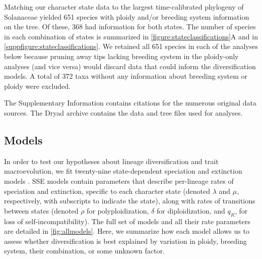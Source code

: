 Matching our character state data to the largest time-calibrated phylogeny of Solanaceae \citep{sarkinen_2013} yielded 651 species with ploidy and/or breeding system information on the tree.
Of these, 368 had information for both states.
The number of species in each combination of states is summarized in \cref{figure:stateclassifications}A and in \cref{suppfigure:stateclassifications}.
We retained all 651 species in each of the analyses below because pruning away tips lacking breeding system in the ploidy-only analyses (and vice versa) would discard data that could inform the diversification models.
A total of 372 taxa without any information about breeding system or ploidy were excluded.

The Supplementary Information contains citations for the numerous original data sources. %
The Dryad archive contains the data and tree files used for analyses. %

\subsection{Models}

In order to test our hypotheses about lineage diversification and trait macroevolution, we fit twenty-nine state-dependent speciation and extinction models \citep[BiSSE, MuSSE, HiSSE;][]{maddison_2007, fitzjohn_2012, beaulieu_2016}.
SSE models contain parameters that describe per-lineage rates of speciation and extinction, specific to each character state (denoted $\lambda$ and $\mu$, respectively, with subscripts to indicate the state), along with rates of transitions between states (denoted $\rho$ for polyploidization, $\delta$ for diploidization, and $q_{IC}$ for loss of self-incompatibility).
The full set of models and all their rate parameters are detailed in \cref{fig:allmodels}.
Here, we summarize how each model allows us to assess whether diversification is best explained by variation in ploidy, breeding system, their combination, or some unknown factor.

